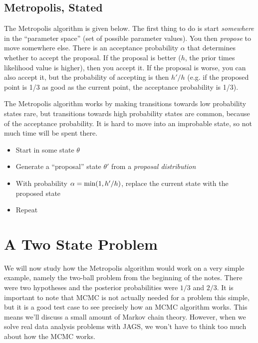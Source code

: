 \subsection{Metropolis, Stated}
The Metropolis algorithm is given below. The first thing to do is start
{\it somewhere} in the ``parameter space'' (set of possible parameter values).
You then
{\it propose} to move somewhere else. There is an acceptance probability $\alpha$
that determines whether to accept the proposal. If the proposal is better
($h$, the prior times likelihood value is higher), then you accept it. If the
proposal is worse, you can also accept it, but the probability of accepting is
then $h'/h$ (e.g. if the proposed point is 1/3 as good as the current point, the
acceptance probability is 1/3).

The Metropolis algorithm works by making transitions towards low probability
states rare, but transitions towards high probability states are common, because
of the acceptance probability. It is hard to move into an improbable state, so
not much time will be spent there.

\begin{framed}
\begin{itemize}
\item Start in some state $\theta$
\item Generate a ``proposal'' state $\theta'$ from a {\it proposal distribution}
\item With probability $\alpha = \textnormal{min}(1, h'/h)$, replace the current
state with the proposed state
\item Repeat
\end{itemize}
\end{framed}

\section{A Two State Problem}
We will now study how the Metropolis algorithm would work on a very simple
example, namely the two-ball problem from the beginning of the notes. There
were two hypotheses and the posterior probabilities were $1/3$ and $2/3$.
It is important to note that MCMC is not actually needed for a problem this
simple, but it is a good test case to see precisely how an MCMC algorithm works.
This means we'll discuss a small amount of Markov chain theory.
However, when we solve real data analysis problems with JAGS,
we won't have to think too
much about how the MCMC works.

